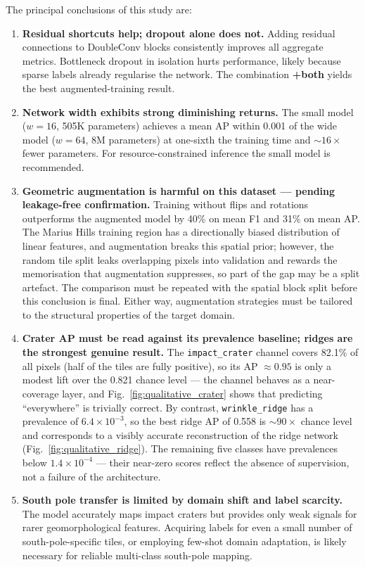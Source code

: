 The principal conclusions of this study are:

\begin{enumerate}
    \item \textbf{Residual shortcuts help; dropout alone does not.} Adding residual connections to DoubleConv blocks consistently improves all aggregate metrics. Bottleneck dropout in isolation hurts performance, likely because sparse labels already regularise the network. The combination \textbf{+both} yields the best augmented-training result.

    \item \textbf{Network width exhibits strong diminishing returns.} The small model ($w=16$, 505K parameters) achieves a mean AP within 0.001 of the wide model ($w=64$, 8M parameters) at one-sixth the training time and ${\sim}16\times$ fewer parameters. For resource-constrained inference the small model is recommended.

    \item \textbf{Geometric augmentation is harmful on this dataset — pending leakage-free confirmation.} Training without flips and rotations outperforms the augmented model by 40\% on mean F1 and 31\% on mean AP. The Marius Hills training region has a directionally biased distribution of linear features, and augmentation breaks this spatial prior; however, the random tile split leaks overlapping pixels into validation and rewards the memorisation that augmentation suppresses, so part of the gap may be a split artefact. The comparison must be repeated with the spatial block split before this conclusion is final. Either way, augmentation strategies must be tailored to the structural properties of the target domain.

    \item \textbf{Crater AP must be read against its prevalence baseline; ridges are the strongest genuine result.} The \texttt{impact\_crater} channel covers 82.1\% of all pixels (half of the tiles are fully positive), so its AP $\approx 0.95$ is only a modest lift over the 0.821 chance level — the channel behaves as a near-coverage layer, and Fig.~\ref{fig:qualitative_crater} shows that predicting ``everywhere'' is trivially correct. By contrast, \texttt{wrinkle\_ridge} has a prevalence of $6.4\times10^{-3}$, so the best ridge AP of 0.558 is ${\sim}90\times$ chance level and corresponds to a visibly accurate reconstruction of the ridge network (Fig.~\ref{fig:qualitative_ridge}). The remaining five classes have prevalences below $1.4\times10^{-4}$ — their near-zero scores reflect the absence of supervision, not a failure of the architecture.

    \item \textbf{South pole transfer is limited by domain shift and label scarcity.} The model accurately maps impact craters but provides only weak signals for rarer geomorphological features. Acquiring labels for even a small number of south-pole-specific tiles, or employing few-shot domain adaptation, is likely necessary for reliable multi-class south-pole mapping.
\end{enumerate}

